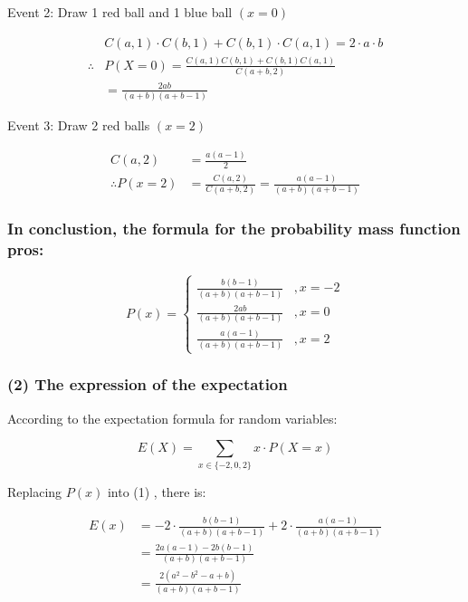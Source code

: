 \documentclass[
]{article}
\begin{document}
Event 2: Draw 1 red ball and 1 blue ball \((x=0)\)

\[
\begin{aligned}
& C(a, 1) \cdot C(b, 1)+C(b, 1) \cdot C(a, 1)=2 \cdot a \cdot b \\
\therefore  & P(X=0)=\frac{C(a, 1) C(b, 1)+C(b, 1) C(a, 1)}{C(a+b, 2)}\\
&=\frac{2 a b}{(a+b)(a+b-1)}
\end{aligned}
\]

Event 3: Draw 2 red balls \((x=2)\)

\[
\begin{aligned}
C(a, 2) & =\frac{a(a-1)}{2} \\
\therefore P(x=2) & =\frac{C(a, 2)}{C(a+b, 2)}=\frac{a(a-1)}{(a+b)(a+b-1)}
\end{aligned}
\]

\subsubsection{In conclustion, the formula for the probability mass
function
pros:}\label{in-conclustion-the-formula-for-the-probability-mass-function-pros}

\[
P(x)= \begin{cases}\frac{b(b-1)}{(a+b)(a+b-1)} & , x=-2 \\ \frac{2a b}{(a+b)(a+b-1)} & , x=0 \\ \frac{a(a-1)}{(a+b)(a+b-1)} & , x=2\end{cases}
\]

\subsubsection{(2) The expression of the
expectation}\label{the-expression-of-the-expectation}

According to the expectation formula for random variables:

\[
\begin{equation*}
E(X)=\sum_{x \in\{-2,0,2\}} x \cdot P(X=x) \tag{1}
\end{equation*}
\]

Replacing \(P(x)\) into (1) , there is:

\[
\begin{align*}
E(x) & =-2 \cdot \frac{b(b-1)}{(a+b)(a+b-1)}+2 \cdot \frac{a(a-1)}{(a+b)(a+b-1)} \\
& =\frac{2 a(a-1)-2 b(b-1)}{(a+b)(a+b-1)} \\
& =\frac{2\left(a^{2}-b^{2}-a+b\right)}{(a+b)(a+b-1)} \tag{2}
\end{align*}
\]
\end{document}
